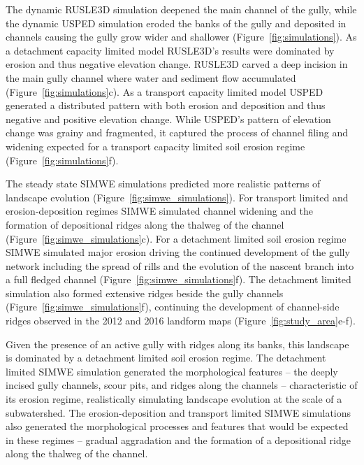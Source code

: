 \documentclass[esurf, manuscript]{copernicus}
\begin{document}
The dynamic RUSLE3D simulation
deepened the main channel of the gully,
while the dynamic USPED simulation
eroded the banks of the gully
and deposited in channels
causing the gully grow wider and shallower
(Figure~\ref{fig:simulations}). 
%
As a detachment capacity limited model
RUSLE3D's results were
dominated by erosion and 
thus negative elevation change.
%
RUSLE3D carved a deep incision 
in the main gully channel
where water and sediment flow accumulated
(Figure~\ref{fig:simulations}c). 
%
As a transport capacity limited model
USPED generated a distributed pattern
with both erosion and deposition and thus
negative and positive elevation change. 
%
While USPED's pattern of elevation change
was grainy and fragmented, 
it captured the process of channel 
filing and widening expected for 
a transport capacity limited soil erosion regime
(Figure~\ref{fig:simulations}f). 

The steady state SIMWE simulations 
predicted more realistic patterns 
of landscape evolution
(Figure~\ref{fig:simwe_simulations}). 
%
For transport limited and
erosion-deposition regimes
SIMWE simulated
channel widening 
and the formation of depositional ridges
along the thalweg of the channel
(Figure~\ref{fig:simwe_simulations}c).
%
For a detachment limited soil erosion regime
SIMWE simulated major erosion
driving the continued development 
of the gully network
including the spread of rills and
the evolution of the nascent branch
into a full fledged channel
(Figure~\ref{fig:simwe_simulations}f). 
%
The detachment limited simulation
also formed extensive ridges
beside the gully channels 
(Figure~\ref{fig:simwe_simulations}f), 
continuing the development of 
channel-side ridges
observed in the 2012 and 2016 landform maps
(Figure~\ref{fig:study_area}e-f). 

Given the presence of an active gully 
with ridges along its banks,
this landscape is dominated by 
a detachment limited soil erosion regime.
%
The detachment limited SIMWE simulation 
generated the morphological features
-- the deeply incised gully channels, 
scour pits,
and ridges along the channels 
--
characteristic of its erosion regime,
realistically simulating landscape evolution 
at the scale of a subwatershed. 
%
The erosion-deposition and transport limited 
SIMWE simulations also generated 
the morphological processes and features
that would be expected in these regimes
-- gradual aggradation
and the formation of a depositional ridge 
along the thalweg of the channel.
\end{document}
